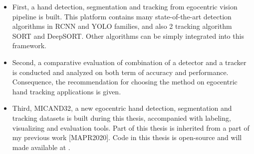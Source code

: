 \begin{itemize}
	\item First, a hand detection, segmentation and tracking from egocentric vision pipeline is built. This platform contains many state-of-the-art detection algorithms in RCNN and YOLO families, and also 2 tracking algorithm SORT and DeepSORT. Other algorithms can be simply integrated into this framework.
	\item Second, a comparative evaluation of combination of a detector and a tracker is conducted and analyzed on both term of accuracy and performance. Consequence, the recommendation for choosing the method on egocentric hand tracking applications is given.
	\item Third, MICAND32, a new egocentric hand detection, segmentation and tracking datasets is built during this thesis, accompanied with labeling, visualizing and evaluation tools.
	Part of this thesis is inherited from a part of my previous work [MAPR2020]. Code in this thesis is open-source and will made available at .
\end{itemize}
